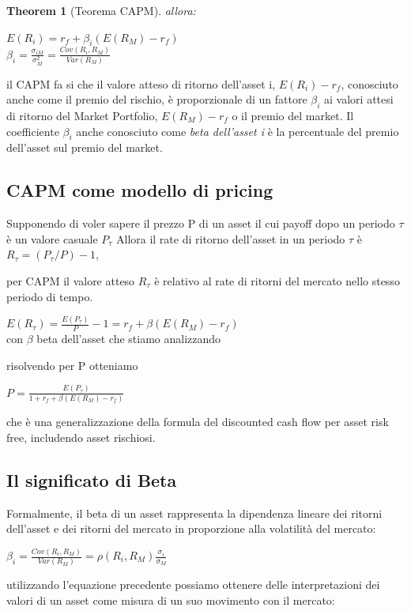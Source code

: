 \documentclass[a4paper,11pt]{report}
\newtheorem{theorem}{Theorem}
\begin{document}
{\begin{theorem}[Teorema CAPM]
	allora:
\begin{center}
	$E(R_i)=r_f+\beta_i (E(R_M)-r_f)$ \\
	$ \beta_i= {\frac {\sigma_{iM}}{\sigma_M^2}} = {\frac {Cov(R_i,R_M)}{Var(R_M)}} $
\end{center}
\end{theorem}
	il CAPM fa si che il valore atteso di ritorno dell'asset i, $E(R_i)-r_f$, conosciuto anche come il premio del rischio, è proporzionale  \newline
	di un fattore $\beta_i$ ai valori attesi di ritorno del Market Portfolio, $E(R_M)-r_f$ o il premio del market. \newline
	Il coefficiente $\beta_i$ anche conosciuto come \emph{beta dell'asset i} è la percentuale del premio dell'asset sul premio del market.
\subsection{CAPM come modello di pricing}
	Supponendo di voler sapere il prezzo P di un asset il cui payoff dopo un periodo $\tau$ è un valore casuale $P_\tau$ \newline
	Allora il rate di ritorno dell'asset in un periodo $\tau$ è $R_\tau = (P_\tau /P) - 1$,
	
	per CAPM il valore atteso $R_\tau$ è relativo al rate di ritorni del mercato nello stesso periodo di tempo.
\begin{center}
	$E(R_\tau)={\frac {E(P_\tau)}{P}}-1 = r_f + \beta(E(R_M)-r_f) $ \\
	con $\beta$ beta dell'asset che stiamo analizzando
\end{center}
	risolvendo per P otteniamo
\begin{center}
	$P= {\frac {E(P_\tau)}{1+r_f+\beta(E(R_M)-r_f)}} $
\end{center}
 	che è una generalizzazione della formula del discounted cash flow per asset risk free, includendo asset rischiosi.
\subsection{Il significato di Beta}
	Formalmente, il beta di un asset rappresenta la dipendenza lineare dei ritorni dell'asset e dei ritorni del mercato in proporzione alla volatilità del mercato:
\begin{center}
	\Large{$ \beta_i = {\frac {Cov(R_i,R_M)}{Var(R_M)}} = \rho(R_i,R_M){\frac {\sigma_i}{\sigma_M}}$}
\end{center}
	utilizzando l'equazione precedente possiamo ottenere delle interpretazioni dei valori di un asset come misura di un suo movimento con il mercato:

}
\end{document}
